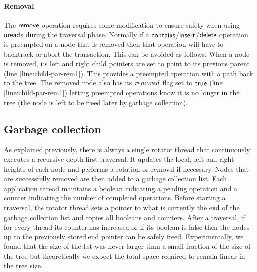 \paragraph{Removal}
The $\act{remove}$ operation requires some modification to ensure safety when using $\act{uread}$s during the traversal phase.
Normally if a $\act{contains}$/$\act{insert}$/$\act{delete}$ operation is preempted on a node that is removed then that operation will have to backtrack or abort the transaction.
This can be avoided as follows.
When a node is removed, its left and right child pointers are set to point to its previous parent (line \ref{line:child-par-rem1}).%
This provides a preempted operation with a path back to the tree.
The removed node also has its $\ms{removed}$ flag set to $\lit{true}$ (line \ref{line:child-par-rem1}) 
letting preempted operations know it is no longer in the tree (the node is left to be freed later by garbage collection).

\subsection{Garbage collection}\label{ssec:gc}

As explained previously, there is always a single rotator thread that continuously executes a recursive depth 
first traversal. 
It updates the local, left and right heights of each node and performs a rotation
or removal
if necessary. Nodes that are successfully removed are then added to a
garbage collection list.
Each 
application thread maintains a boolean indicating a pending operation and a counter indicating the number of 
completed operations. Before starting a traversal, the rotator thread sets a pointer to what is currently the end of 
the garbage collection list and copies all booleans and counters. After a traversal, if for every thread its counter 
has increased or if its boolean is false then the nodes up to the previously stored end pointer can be safely 
freed. Experimentally, we found that the size of the list was never larger than a small fraction of the size of the 
tree but theoretically we expect the total space required to remain linear in the tree size.



